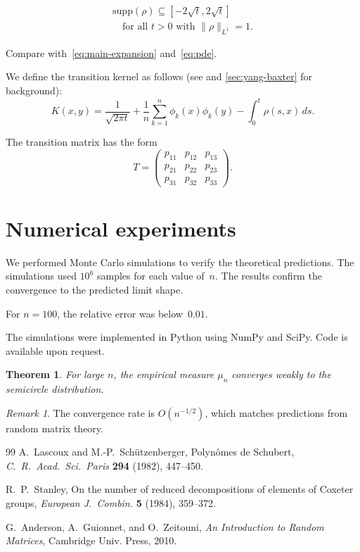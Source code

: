 \documentclass{amsart}
\theoremstyle{plain}
\newtheorem{theorem}{Theorem}[section]
\theoremstyle{definition}
\theoremstyle{remark}
\newtheorem*{remark}{Remark}
\begin{document}
\begin{multline}
\label{eq:support-bound}
\mathrm{supp}(\rho) \subseteq [-2\sqrt{t}, 2\sqrt{t}] \\
\quad \text{for all } t > 0 \text{ with } \|\rho\|_{L^1} = 1.
\end{multline}

Compare with~\eqref{eq:main-expansion} and~\ref{eq:pde}.

We define the transition kernel as follows (see \cite{AGZ2010}
and \ref{sec:yang-baxter} for background):
\begin{equation*}
K(x,y) = \frac{1}{\sqrt{2\pi t}}
+ \frac{1}{n} \sum_{k=1}^{n} \phi_k(x) \phi_k(y)
- \int_0^t \rho(s,x)\, ds.
\end{equation*}

The transition matrix has the form
\begin{equation}\label{eq:tmatrix}
T =
\begin{pmatrix} p_{11} & p_{12} & p_{13} \\ p_{21} & p_{22} & p_{23} \\ p_{31} & p_{32} & p_{33} \end{pmatrix}.
\end{equation}

\section{Numerical experiments}
\label{sec:numerical}
	We performed Monte Carlo simulations to verify the theoretical
	predictions.  The simulations used $10^6$ samples for each value
	of~$n$.	The results confirm the convergence to the predicted
	limit shape.

	For $n = 100$, the relative error was below~$0.01$.

	The simulations were implemented in Python using NumPy and SciPy.
	Code is available upon request.

\begin{theorem}
For large $n$, the empirical measure $\mu_n$ converges weakly to the
semicircle distribution.
\end{theorem}

\begin{remark}
The convergence rate is $O(n^{-1/2})$, which matches predictions from
random matrix theory.
\end{remark}

\begin{thebibliography}{99}
 A.~Lascoux and M.-P.~Sch\"utzenberger,
  Polyn\^omes de Schubert,
  \emph{C.~R.~Acad.~Sci.~Paris} \textbf{294} (1982), 447--450.

 R.~P.~Stanley,
  On the number of reduced decompositions of elements of Coxeter groups,
  \emph{European J.~Combin.} \textbf{5} (1984), 359--372.

 G.~Anderson, A.~Guionnet, and O.~Zeitouni,
  \emph{An Introduction to Random Matrices},
  Cambridge Univ. Press, 2010.
\end{thebibliography}
\end{document}
